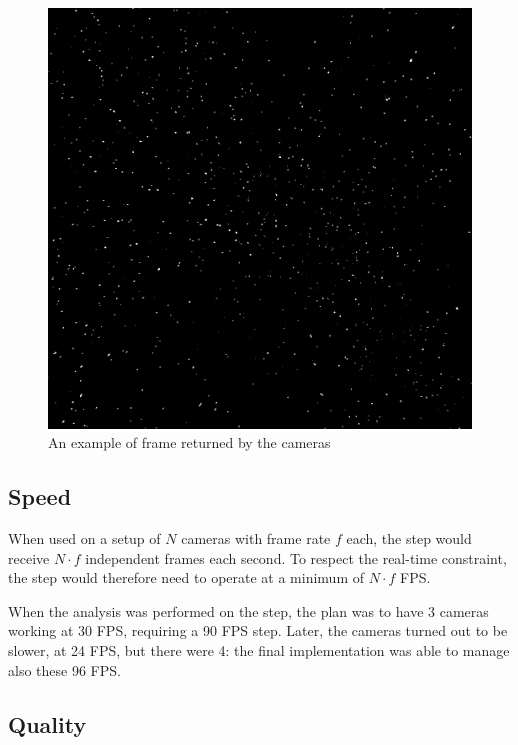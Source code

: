 \begin{figure}
	\centerline{\includegraphics[width=\locateimgsize]{images/locate/_original-frame-full.png}}
	\caption{\centering An example of frame returned by the cameras}
	\label{fig:locate:original}
\end{figure}

\subsection{Speed}

When used on a setup of $N$ cameras with frame rate $f$ each, the \locate* step would receive $N{\cdot}f$ independent frames each second.
To respect the real-time constraint, the \locate* step would therefore need to operate at a minimum of $N{\cdot}f$ FPS.

When the analysis was performed on the \locate* step, the plan was to have 3 cameras working at 30 FPS, requiring a 90 FPS \locate* step.
Later, the cameras turned out to be slower, at 24 FPS, but there were 4: the final \locate* implementation was able to manage also these 96 FPS.

\subsection{Quality}

